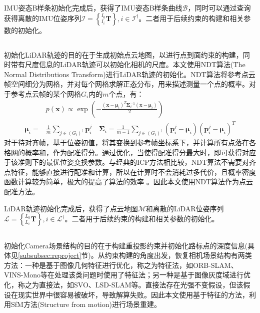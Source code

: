 IMU姿态B样条初始化完成后，获得了IMU姿态B样条曲线$\mathcal{B}$，同时可以通过查询获得离散的IMU位姿序列$\mathcal{I}=\left\lbrace {^{I_0}_{I_{i}}}\boldsymbol{T} \right\rbrace,i\in\mathcal{I}^\dagger$。二者用于后续约束的构建和相关参数的初始化。

\subsection{}
初始化LiDAR轨迹的目的在于生成初始点云地图，以进行点到面约束的构建，同时带有尺度信息的LiDAR轨迹可以初始化相机的尺度。本文使用NDT算法(The Normal Distributions Transform)进行LiDAR轨迹的初始化。NDT算法将参考点云帧空间细分为网格，并对每个网格求解正态分布，用来描述测量一个点的概率。对于参考点云帧的某个网格$G_i$内的$m$个点，有：
\begin{equation}
  \begin{aligned}
                        & p(\boldsymbol{x})\propto\exp\left(-\frac{(\boldsymbol{x}-\boldsymbol{\mu}_i)^T\boldsymbol{\Sigma}^{-1}_i(\boldsymbol{x}-\boldsymbol{\mu}_i)}{2}\right)                                                 \\
    \boldsymbol{\mu}_i= & \frac{1}{m}\sum_{j\in(G_i)^\dagger}\boldsymbol{p}_i^j\quad \boldsymbol{\Sigma}_i=\frac{1}{m-1}\sum_{j\in(G_i)^\dagger}(\boldsymbol{p}_i^j-\boldsymbol{\mu}_i)(\boldsymbol{p}_i^j-\boldsymbol{\mu}_i)^T
  \end{aligned}
\end{equation}
对于待对齐帧，基于位姿初值，将其变换到参考帧坐标系下，并计算所有点落在各格网的概率和，作为配准得分。通过优化，当使得配准得分最大时，即可获得对应于该准则下的最优位姿变换参数。与经典的ICP方法\cite{rusinkiewicz2001efficient}相比较，NDT算法不需要对齐点特征，能够直接进行配准和计算，所以在计算时不会消耗过多代价，且概率密度函数计算较为简单，极大的提高了算法的效率 。因此本文使用NDT算法作为点云配准方法。

LiDAR轨迹初始化完成后，获得了点云地图$\mathcal{M}$和离散的LiDAR位姿序列$\mathcal{L}=\left\lbrace {^{L_0}_{L_{i}}}\boldsymbol{T} \right\rbrace,i\in\mathcal{L}^\dagger$。二者用于后续约束的构建和相关参数的初始化。

\subsection{}
初始化Camera场景结构的目的在于构建重投影约束并初始化路标点的深度信息(具体见\ref{subsubsec:reproject}节)。从约束构建的角度出发，恢复相机场景结构有两类方法：一种是基于图像几何特征进行优化，称之为特征法，如ORB-SLAM\cite{mur2015orb}、VINS-Mono\cite{qin2018vins}等在处理该类问题时使用了特征法；另一种是基于图像灰度域进行优化，称之为直接法，如SVO\cite{forster2014svo}、LSD-SLAM\cite{engel2014lsd}等。直接法存在光强不变假设，但该假设在现实世界中很容易被破坏，导致解算失败。因此本文使用基于特征的方法，利用SfM方法(Structure from motion)进行场景重建。

